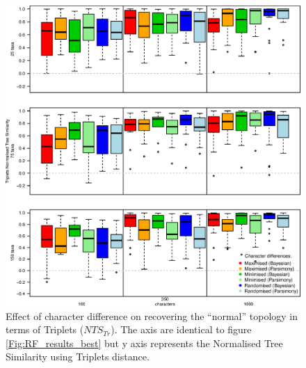 \documentclass[12pt,letterpaper]{article}
\begin{document}
\begin{figure}[!htbp]
\centering
   \includegraphics[width=1\textwidth]{Tr_results_best.eps}
\caption{Effect of character difference on recovering the ``normal'' topology in terms of Triplets ($NTS_{Tr}$). The axis are identical to figure \ref{Fig:RF_results_best} but y axis represents the Normalised Tree Similarity using Triplets distance.}
\label{Fig:Tr_results_best}
\end{figure}
\end{document}
